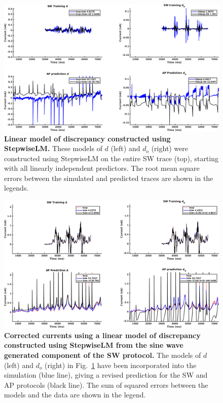 \documentclass[11pt,a4paper,oneside]{article}
\begin{document}
\clearpage

\begin{figure}[t]
\begin{center}
\includegraphics[scale=0.42]{Figures/StepwiseLM_SW_AP_core_discrepancy.png}
\caption{\textbf{Linear model of discrepancy constructed using StepwiseLM.} These models of $d$ (left) and $d_o$ (right) were constructed using StepwiseLM on the entire SW trace (top), starting with all linearly independent predictors. The root mean square errors between the simulated and predicted traces are shown in the legends. } 
\label{Fig_StepwiseLM_SW_AP_core_discrepancy}
\end{center}
\end{figure}

\begin{figure}[hb]
\begin{center}
\includegraphics[scale=0.42]{Figures/StepwiseLM_SW_AP_core_currents.png}
\caption{\textbf{Corrected currents using a linear model of discrepancy constructed using StepwiseLM from the sine wave generated component of the SW protocol.} The models of $d$ (left) and $d_o$ (right) in Fig.~\ref{Fig_StepwiseLM_SW_AP_core_discrepancy} have been incorporated into the simulation (blue line), giving a revised prediction for the SW and AP protocols (black line). The sum of squared errors between the models and the data are shown in the legend.}
\label{Fig_StepwiseLM_SW_AP_core_currents}
\end{center}
\end{figure}
\end{document}
